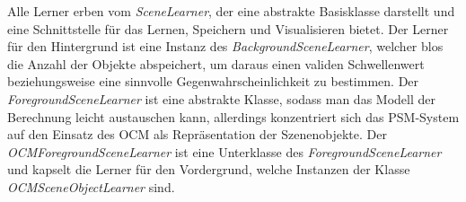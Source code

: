 Alle Lerner erben vom \textit{SceneLearner}, der eine abstrakte Basisklasse darstellt und eine Schnittstelle für das Lernen, Speichern und Visualisieren bietet. Der Lerner für den Hintergrund ist eine Instanz des \textit{BackgroundSceneLearner}, welcher blos die Anzahl der Objekte abspeichert, um daraus einen validen Schwellenwert beziehungsweise eine sinnvolle Gegenwahrscheinlichkeit zu bestimmen. Der \textit{ForegroundSceneLearner} ist eine abstrakte Klasse, sodass man das Modell der Berechnung leicht austauschen kann, allerdings konzentriert sich das PSM-System auf den Einsatz des OCM als Repräsentation der Szenenobjekte. Der \textit{OCMForegroundSceneLearner} ist eine Unterklasse des \textit{ForegroundSceneLearner} und kapselt die Lerner für den Vordergrund, welche Instanzen der Klasse \textit{OCMSceneObjectLearner} sind.
\begin{deprecated}
\cite{gehrung14}
\end{deprecated}

